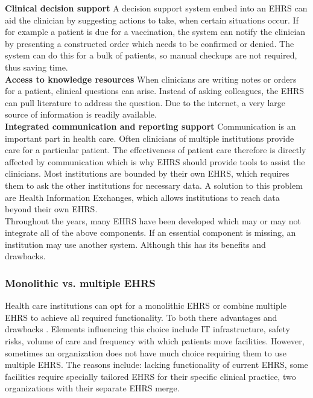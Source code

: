         \noindent\textbf{Clinical decision support} A decision support system embed into an EHRS can aid the clinician by suggesting actions to take, when certain situations occur. If for example a patient is due for a vaccination, the system can notify the clinician by presenting a constructed order which needs to be confirmed or denied. The system can do this for a bulk of patients, so manual checkups are not required, thus saving time.\\

        \noindent\textbf{Access to knowledge resources} When clinicians are writing notes or orders for a patient, clinical questions can arise. Instead of asking colleagues, the EHRS can pull literature to address the question. Due to the internet, a very large source of information is readily available.\\

        \noindent\textbf{Integrated communication and reporting support} Communication is an important part in health care. Often clinicians of multiple institutions provide care for a particular patient. The effectiveness of patient care therefore is directly affected by communication which is why EHRS should provide tools to assist the clinicians. Most institutions are bounded by their own EHRS, which requires them to ask the other institutions for necessary data. A solution to this problem are Health Information Exchanges, which allows institutions to reach data beyond their own EHRS.\\
        
        \noindent Throughout the years, many EHRS have been developed which may or may not integrate all of the above components. If an essential component is missing, an institution may use another system. Although this has its benefits and drawbacks.

        \subsubsection{Monolithic vs. multiple EHRS} \label{ehrs_comparison}

        Health care institutions can opt for a monolithic EHRS or combine multiple EHRS to achieve all required functionality. To both there advantages and drawbacks \cite{multiple_ehrs}. Elements influencing this choice include IT infrastructure, safety risks, volume of care and frequency with which patients move facilities. However, sometimes an organization does not have much choice requiring them to use multiple EHRS. The reasons include: lacking functionality of current EHRS, some facilities require specially tailored EHRS for their specific clinical practice, two organizations with their separate EHRS merge.


